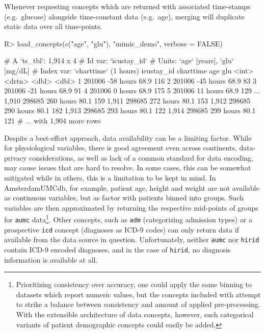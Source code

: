 \documentclass[
  notitle]{jss}
\begin{document}
Whenever requesting concepts which are returned with associated
time-stamps (e.g.~glucose) alongside time-constant data (e.g.~age),
merging will duplicate static data over all time-points.

\begin{CodeChunk}
\begin{CodeInput}
R> load_concepts(c("age", "glu"), "mimic_demo", verbose = FALSE)
\end{CodeInput}
\begin{CodeOutput}
# A `ts_tbl`: 1,914 x 4
# Id var:     `icustay_id`
# Units:      `age` [years], `glu` [mg/dL]
# Index var:  `charttime` (1 hours)
      icustay_id charttime   age   glu
           <int> <drtn>    <dbl> <dbl>
    1     201006 -58 hours  68.9   116
    2     201006 -45 hours  68.9    83
    3     201006 -21 hours  68.9    91
    4     201006   0 hours  68.9   175
    5     201006  11 hours  68.9   129
  ...
1,910     298685 260 hours  80.1   159
1,911     298685 272 hours  80.1   153
1,912     298685 290 hours  80.1   182
1,913     298685 293 hours  80.1   122
1,914     298685 299 hours  80.1   121
# ... with 1,904 more rows
\end{CodeOutput}
\end{CodeChunk}

Despite a best-effort approach, data availability can be a limiting
factor. While for physiological variables, there is good agreement even
across continents, data-privacy considerations, as well as lack of a
common standard for data encoding, may cause issues that are hard to
resolve. In some cases, this can be somewhat mitigated while in others,
this is a limitation to be kept in mind. In AmsterdamUMCdb, for example,
patient age, height and weight are not available as continuous
variables, but as factor with patients binned into groups. Such
variables are then approximated by returning the respective mid-points
of groups for \texttt{aumc} data\footnote{Prioritizing consistency over
  accuracy, one could apply the same binning to datasets which report
  numeric values, but the concepts included with  attempt to
  strike a balance between consistency and amount of applied
  pre-processing. With the extensible architecture of data concepts,
  however, such categorical variants of patient demographic concepts
  could easily be added.}. Other concepts, such as \texttt{adm}
(categorizing admission types) or a prospective \texttt{icd} concept
(diagnoses as ICD-9 codes) can only return data if available from the
data source in question. Unfortunately, neither \texttt{aumc} nor
\texttt{hirid} contain ICD-9 encoded diagnoses, and in the case of
\texttt{hirid}, no diagnosis information is available at all.
\end{document}
